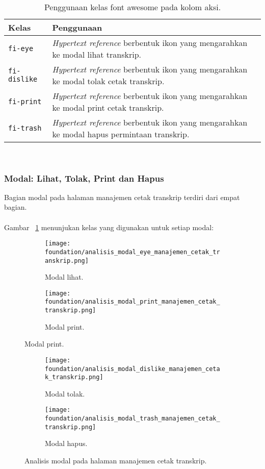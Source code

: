 \begin{table}[H]
	\centering
	\caption{Penggunaan kelas font awesome pada kolom aksi.}
	\begin{tabularx}{\textwidth}{lX}
		\toprule
		Kelas     & Penggunaan \\
		\midrule
		\texttt{fi-eye} & \textit{Hypertext reference} berbentuk ikon yang mengarahkan ke modal lihat transkrip.\\
		\texttt{fi-dislike} & \textit{Hypertext reference} berbentuk ikon yang mengarahkan ke modal tolak cetak transkrip.\\
		\texttt{fi-print} & \textit{Hypertext reference} berbentuk ikon yang mengarahkan ke modal print cetak transkrip.\\
		\texttt{fi-trash} & \textit{Hypertext reference} berbentuk ikon yang mengarahkan ke modal hapus permintaan transkrip.\\
		\bottomrule
	\end{tabularx}%
	\label{table:analisisFontAwesomeManajemenCetakTranskrip}
\end{table} \\

\subsubsection{Modal: Lihat, Tolak, Print dan Hapus}

Bagian modal pada halaman manajemen cetak transkrip terdiri dari empat bagian.\\ \\ 
Gambar ~\ref{fig:analisisModalManajemenCetakTranskrip} menunjukan kelas yang digunakan untuk setiap modal:
\begin{figure}[h!]	
	\centering
	\begin{subfigure}[b]{0.25\linewidth}   
		\texttt{[image: foundation/analisis\_modal\_eye\_manajemen\_cetak\_transkrip.png]}
		\caption{Modal lihat.}
	\end{subfigure}
	\begin{subfigure}[b]{0.45\linewidth} 
		\texttt{[image: foundation/analisis\_modal\_print\_manajemen\_cetak\_transkrip.png]}
		\caption{Modal print.} 
	\end{subfigure}
\end{figure}
\begin{figure}[h!]
	\centering
	\ContinuedFloat	
	\begin{subfigure}[b]{0.45\linewidth}  
		\texttt{[image: foundation/analisis\_modal\_dislike\_manajemen\_cetak\_transkrip.png]}
		\caption{Modal tolak.} 
	\end{subfigure}
	\begin{subfigure}[b]{0.45\linewidth} 
		\texttt{[image: foundation/analisis\_modal\_trash\_manajemen\_cetak\_transkrip.png]}
		\caption{Modal hapus.}
	\end{subfigure}
	\caption{Analisis modal pada halaman manajemen cetak transkrip.}
	\label{fig:analisisModalManajemenCetakTranskrip}	
\end{figure}

